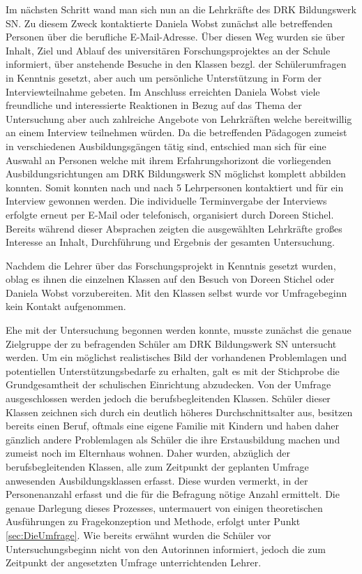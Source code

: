 Im nächsten Schritt wand man sich nun an die Lehrkräfte des DRK Bildungswerk SN. Zu diesem Zweck kontaktierte Daniela Wobst zunächst alle betreffenden Personen über die berufliche E-Mail-Adresse. Über diesen Weg wurden sie über Inhalt, Ziel und Ablauf des universitären Forschungsprojektes an der Schule informiert, über anstehende Besuche in den Klassen bezgl. der Schülerumfragen in Kenntnis gesetzt, aber auch um persönliche Unterstützung in Form der Interviewteilnahme gebeten. Im Anschluss erreichten Daniela Wobst viele freundliche und interessierte Reaktionen in Bezug auf das Thema der Untersuchung aber auch zahlreiche Angebote von Lehrkräften welche bereitwillig an einem Interview teilnehmen würden. Da die betreffenden Pädagogen zumeist in verschiedenen Ausbildungsgängen tätig sind, entschied man sich für eine Auswahl an Personen welche mit ihrem Erfahrungshorizont die vorliegenden Ausbildungsrichtungen am DRK Bildungswerk SN möglichst komplett abbilden konnten. Somit konnten nach und nach 5 Lehrpersonen kontaktiert und für ein Interview gewonnen werden. Die individuelle Terminvergabe der Interviews erfolgte erneut per E-Mail oder telefonisch, organisiert durch Doreen Stichel. Bereits während dieser Absprachen zeigten die ausgewählten Lehrkräfte großes Interesse an Inhalt, Durchführung und Ergebnis der gesamten Untersuchung.

Nachdem die Lehrer über das Forschungsprojekt in Kenntnis gesetzt wurden, oblag es ihnen die einzelnen Klassen auf den Besuch von Doreen Stichel oder Daniela Wobst vorzubereiten. Mit den Klassen selbst wurde vor Umfragebeginn kein Kontakt aufgenommen.

Ehe mit der Untersuchung begonnen werden konnte, musste zunächst die genaue Zielgruppe der zu befragenden Schüler am DRK Bildungswerk SN untersucht werden. Um ein möglichst realistisches Bild der vorhandenen Problemlagen und potentiellen Unterstützungsbedarfe zu erhalten, galt es mit der Stichprobe die Grundgesamtheit der schulischen Einrichtung abzudecken. Von der Umfrage ausgeschlossen werden jedoch die berufsbegleitenden Klassen. Schüler dieser Klassen zeichnen sich durch ein deutlich höheres Durchschnittsalter aus, besitzen bereits einen Beruf, oftmals eine eigene Familie mit Kindern und haben daher gänzlich andere Problemlagen als Schüler die ihre Erstausbildung machen und zumeist noch im Elternhaus wohnen. Daher wurden, abzüglich der berufsbegleitenden Klassen, alle zum Zeitpunkt der geplanten Umfrage anwesenden Ausbildungsklassen erfasst. Diese wurden vermerkt, in der Personenanzahl erfasst und die für die Befragung nötige Anzahl ermittelt. Die genaue Darlegung dieses Prozesses, untermauert von einigen theoretischen Ausführungen zu Fragekonzeption und Methode, erfolgt unter Punkt \ref{sec:DieUmfrage}. Wie bereits erwähnt wurden die Schüler vor Untersuchungsbeginn nicht von den Autorinnen informiert, jedoch die zum Zeitpunkt der angesetzten Umfrage unterrichtenden Lehrer.

